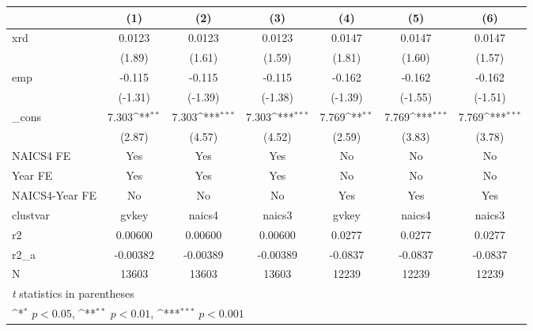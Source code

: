 {
\def\sym#1{\ifmmode^{#1}\else\(^{#1}\)\fi}
\begin{tabular}{l*{6}{c}}
\hline\hline
            &\multicolumn{1}{c}{(1)}         &\multicolumn{1}{c}{(2)}         &\multicolumn{1}{c}{(3)}         &\multicolumn{1}{c}{(4)}         &\multicolumn{1}{c}{(5)}         &\multicolumn{1}{c}{(6)}         \\
\hline
xrd         &      0.0123         &      0.0123         &      0.0123         &      0.0147         &      0.0147         &      0.0147         \\
            &      (1.89)         &      (1.61)         &      (1.59)         &      (1.81)         &      (1.60)         &      (1.57)         \\
[1em]
emp         &      -0.115         &      -0.115         &      -0.115         &      -0.162         &      -0.162         &      -0.162         \\
            &     (-1.31)         &     (-1.39)         &     (-1.38)         &     (-1.39)         &     (-1.55)         &     (-1.51)         \\
[1em]
\_cons      &       7.303\sym{**} &       7.303\sym{***}&       7.303\sym{***}&       7.769\sym{**} &       7.769\sym{***}&       7.769\sym{***}\\
            &      (2.87)         &      (4.57)         &      (4.52)         &      (2.59)         &      (3.83)         &      (3.78)         \\
[1em]
NAICS4 FE   &         Yes         &         Yes         &         Yes         &          No         &          No         &          No         \\
[1em]
Year FE     &         Yes         &         Yes         &         Yes         &          No         &          No         &          No         \\
[1em]
NAICS4-Year FE&          No         &          No         &          No         &         Yes         &         Yes         &         Yes         \\
\hline
clustvar    &       gvkey         &      naics4         &      naics3         &       gvkey         &      naics4         &      naics3         \\
r2          &     0.00600         &     0.00600         &     0.00600         &      0.0277         &      0.0277         &      0.0277         \\
r2\_a        &    -0.00382         &    -0.00389         &    -0.00389         &     -0.0837         &     -0.0837         &     -0.0837         \\
N           &       13603         &       13603         &       13603         &       12239         &       12239         &       12239         \\
\hline\hline
\multicolumn{7}{l}{\footnotesize \textit{t} statistics in parentheses}\\
\multicolumn{7}{l}{\footnotesize \sym{*} \(p<0.05\), \sym{**} \(p<0.01\), \sym{***} \(p<0.001\)}\\
\end{tabular}
}

